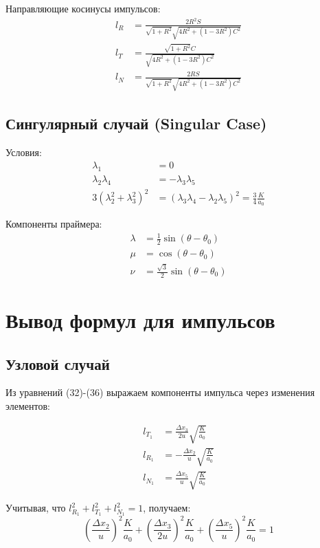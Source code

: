 \documentclass[12pt]{article}
\begin{document}
Направляющие косинусы импульсов:
\begin{align}
l_R &= \frac{2R^2S}{\sqrt{1+R^2}\sqrt{4R^2 + (1-3R^2)C^2}} \tag{52} \\
l_T &= \frac{\sqrt{1+R^2}C}{\sqrt{4R^2 + (1-3R^2)C^2}} \tag{53} \\
l_N &= \frac{2RS}{\sqrt{1+R^2}\sqrt{4R^2 + (1-3R^2)C^2}} \tag{54}
\end{align}

\subsection{Сингулярный случай (Singular Case)}

Условия:
\begin{align}
\lambda_1 &= 0 \tag{24} \\
\lambda_2\lambda_4 &= -\lambda_3\lambda_5 \tag{25} \\
3(\lambda_2^2 + \lambda_3^2)^2 &= (\lambda_3\lambda_4 - \lambda_2\lambda_5)^2 = \frac{3}{4}\frac{K}{a_0} \tag{26}
\end{align}

Компоненты праймера:
\begin{align}
\lambda &= \frac{1}{2}\sin(\theta - \theta_0) \tag{27} \\
\mu &= \cos(\theta - \theta_0) \tag{28} \\
\nu &= \frac{\sqrt{3}}{2}\sin(\theta - \theta_0) \tag{29}
\end{align}

\section{Вывод формул для импульсов}

\subsection{Узловой случай}

Из уравнений (32)-(36) выражаем компоненты импульса через изменения элементов:

\begin{align*}
l_{T_1} &= \frac{\Delta x_3}{2u}\sqrt{\frac{K}{a_0}} \\
l_{R_1} &= -\frac{\Delta x_2}{u}\sqrt{\frac{K}{a_0}} \\
l_{N_1} &= \frac{\Delta x_5}{u}\sqrt{\frac{K}{a_0}}
\end{align*}

Учитывая, что $l_{R_1}^2 + l_{T_1}^2 + l_{N_1}^2 = 1$, получаем:
\begin{equation*}
\left(\frac{\Delta x_2}{u}\right)^2\frac{K}{a_0} + \left(\frac{\Delta x_3}{2u}\right)^2\frac{K}{a_0} + \left(\frac{\Delta x_5}{u}\right)^2\frac{K}{a_0} = 1
\end{equation*}
\end{document}
